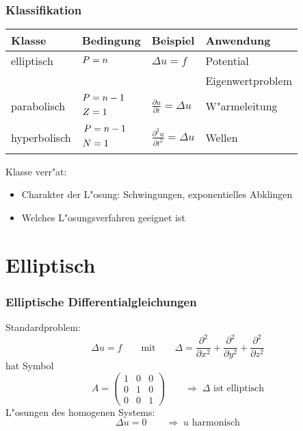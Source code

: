 \documentclass[handout]{beamer}
\begin{document}
\begin{frame}
\frametitle{Klassifikation}

\begin{center}
\begin{tabular}{llll}
Klasse&Bedingung&Beispiel&Anwendung\\
\hline
elliptisch &$\begin{aligned}P&=n\mathstrut\end{aligned}$
	&$\displaystyle \Delta u=f                                $
		&Potential\\
&	&	&Eigenwertproblem\\
\hline
parabolisch&%
$\begin{aligned}P&=n-1\mathstrut\\Z&=1\mathstrut\end{aligned}$
	&$\displaystyle \frac{\partial u}{\partial t}=\Delta u    $
		&W"armeleitung\\
\hline
hyperbolisch&%
$\begin{aligned}P&=n-1\mathstrut\\N&=1\mathstrut\end{aligned}$
	&$\displaystyle \frac{\partial^2 u}{\partial t^2}=\Delta u$
		&Wellen\\
\hline
\end{tabular}
\end{center}

Klasse verr"at:
\begin{itemize}
\item Charakter der L"osung: Schwingungen, exponentielles Abklingen
\item Welches L"osungsverfahren geeignet ist
\end{itemize}

\end{frame}

\section{Elliptisch}

\begin{frame}
\frametitle{Elliptische Differentialgleichungen}
Standardproblem:
\[
\Delta u = f
\qquad\text{mit}\qquad
\Delta 
=
\frac{\partial^2}{\partial x^2}
+
\frac{\partial^2}{\partial y^2}
+
\frac{\partial^2}{\partial z^2}
\]
hat Symbol
\[
A=\begin{pmatrix}1&0&0\\0&1&0\\0&0&1\end{pmatrix}
\qquad
\Rightarrow
\;
\text{$\Delta$ ist elliptisch}
\]
L"osungen des homogenen Systems:
\[
\Delta u=0
\qquad\Rightarrow\;
\text{$u$ harmonisch}
\]
\end{frame}
\end{document}
